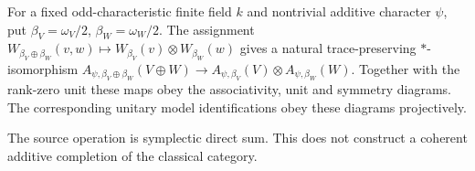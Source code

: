 \begin{proposition}
\statusProved{}
For a fixed odd-characteristic finite field $k$ and nontrivial additive character
$\psi$, put $\beta_V=\omega_V/2$, $\beta_W=\omega_W/2$. The assignment
$W_{\beta_V\oplus\beta_W}(v,w)\mapsto W_{\beta_V}(v)\otimes W_{\beta_W}(w)$ gives a
natural trace-preserving $*$-isomorphism $A_{\psi,\beta_V\oplus\beta_W}(V\oplus W)\to
A_{\psi,\beta_V}(V)\otimes A_{\psi,\beta_W}(W)$. Together with the rank-zero unit
these maps obey the associativity, unit and symmetry diagrams. The corresponding
unitary model identifications obey these diagrams projectively.
\end{proposition}
\begin{scope}
The source operation is symplectic direct sum. This does not construct a coherent additive completion of the classical category.
\end{scope}

